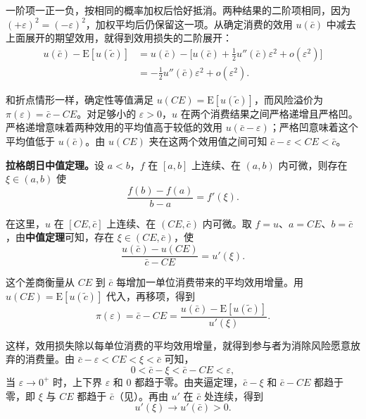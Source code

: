 一阶项一正一负，按相同的概率加权后恰好抵消。两种结果的二阶项相同，因为 $(+\varepsilon)^2=(-\varepsilon)^2$，加权平均后仍保留这一项。从确定消费的效用 $u(\bar c)$ 中减去上面展开的期望效用，就得到效用损失的二阶展开：
\begin{equation*}
 \begin{aligned}
 u(\bar c)-\mathrm E[u(\tilde c)]
 &=u(\bar c)-\bigl[u(\bar c)+\tfrac12 u''(\bar c)\varepsilon^2+o(\varepsilon^2)\bigr]\\
 &=-\tfrac12 u''(\bar c)\varepsilon^2+o(\varepsilon^2).
 \end{aligned}
 \tag{6.II}\label{eq:wj-six-smooth-utility-loss}
\end{equation*}

和折点情形一样，确定性等值满足 $u(CE)=\mathrm E[u(\tilde c)]$，而风险溢价为 $\pi(\varepsilon)=\bar c-CE$。对足够小的 $\varepsilon>0$，$u$ 在两个消费结果之间严格递增且严格凹。严格递增意味着两种效用的平均值高于较低的效用 $u(\bar c-\varepsilon)$；严格凹意味着这个平均值低于 $u(\bar c)$。由 $u(CE)$ 夹在这两个效用值之间可知 $\bar c-\varepsilon<CE<\bar c$。

\textbf{拉格朗日中值定理。}设 $a<b$，$f$ 在 $[a,b]$ 上连续、在 $(a,b)$ 内可微，则存在 $\xi\in(a,b)$ 使
\[
 \frac{f(b)-f(a)}{b-a}=f'(\xi).
\]

在这里，$u$ 在 $[CE,\bar c]$ 上连续、在 $(CE,\bar c)$ 内可微。取 $f=u$、$a=CE$、$b=\bar c$，由\textbf{中值定理}可知，存在 $\xi\in(CE,\bar c)$，使
\[
 \frac{u(\bar c)-u(CE)}{\bar c-CE}=u'(\xi).
\]

这个差商衡量从 $CE$ 到 $\bar c$ 每增加一单位消费带来的平均效用增量。用 $u(CE)=\mathrm E[u(\tilde c)]$ 代入，再移项，得到
\[
 \pi(\varepsilon)=\bar c-CE
 =\frac{u(\bar c)-\mathrm E[u(\tilde c)]}{u'(\xi)}.
\]

这样，效用损失除以每单位消费的平均效用增量，就得到参与者为消除风险愿意放弃的消费量。由 $\bar c-\varepsilon<CE<\xi<\bar c$ 可知，
\[
 0<\bar c-\xi<\bar c-CE<\varepsilon,
\]
当 $\varepsilon\to0^+$ 时，上下界 $\varepsilon$ 和 $0$ 都趋于零。由夹逼定理，$\bar c-\xi$ 和 $\bar c-CE$ 都趋于零，即 $\xi$ 与 $CE$ 都趋于 $\bar c$（见）。再由 $u'$ 在 $\bar c$ 处连续，得到
\[
 u'(\xi)\to u'(\bar c)>0.
\]

\begin{center}
\begin{minipage}{\linewidth}
%
\centering
{}
\end{minipage}
\end{center}

